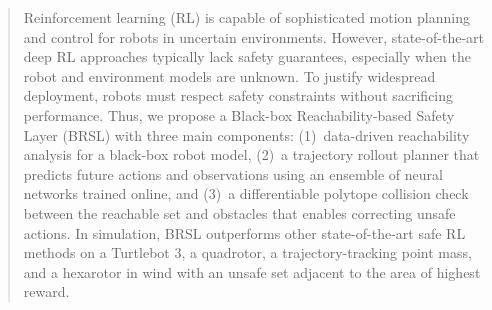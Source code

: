 \begin{abstract}
Reinforcement learning (RL) is capable of sophisticated motion planning and control for robots in uncertain environments.
However, state-of-the-art deep RL approaches typically lack safety guarantees, especially when the robot and environment models are unknown.
To justify widespread deployment, robots must respect safety constraints without sacrificing performance. 
Thus, we propose a Black-box Reachability-based Safety Layer (BRSL) with three main components: (1)~data-driven reachability analysis for a black-box robot model, (2)~a trajectory rollout planner that predicts future actions and observations using an ensemble of neural networks trained online, and (3)~a differentiable polytope collision check between the reachable set and obstacles that enables correcting unsafe actions.
In simulation, BRSL outperforms other state-of-the-art safe RL methods on a Turtlebot 3, a quadrotor, a trajectory-tracking point mass, and a hexarotor in wind with an unsafe set adjacent to the area of highest reward.
\end{abstract}